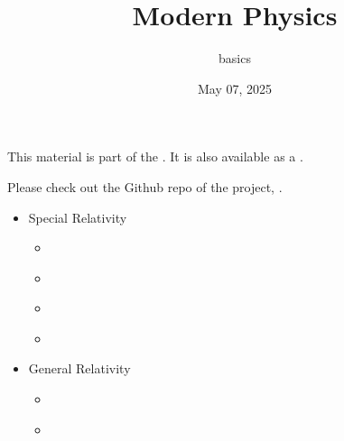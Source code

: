 \documentclass[letterpaper,10pt,english]{jupyterBook}
\title{Modern Physics}
\date{May 07, 2025}
\author{basics}
\begin{document}
\pagestyle{empty}
\sphinxmaketitle
\pagestyle{plain}
\sphinxtableofcontents
\pagestyle{normal}
\label{\detokenize{intro::doc}}


\sphinxAtStartPar
This material is part of the . It is also available as a .

\sphinxAtStartPar
Please check out the Github repo of the project, .
\begin{itemize}
\item {} 
\sphinxAtStartPar
Special Relativity

\begin{itemize}
\item {} 
\sphinxAtStartPar
{\hyperref[\detokenize{ch/relativity-special/intro::doc}]{}}

\item {} 
\sphinxAtStartPar
{\hyperref[\detokenize{ch/relativity-special/notes::doc}]{}}

\item {} 
\sphinxAtStartPar
{\hyperref[\detokenize{ch/relativity-special/lorentz::doc}]{}}

\item {} 
\sphinxAtStartPar
{\hyperref[\detokenize{ch/relativity-special/em::doc}]{}}

\end{itemize}
\end{itemize}
\begin{itemize}
\item {} 
\sphinxAtStartPar
General Relativity

\begin{itemize}
\item {} 
\sphinxAtStartPar
{\hyperref[\detokenize{ch/relativity-general/intro::doc}]{}}

\item {} 
\sphinxAtStartPar
{\hyperref[\detokenize{ch/relativity-general/notes::doc}]{}}

\end{itemize}
\end{itemize}
\end{document}
